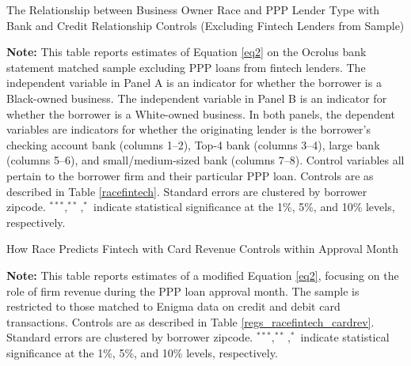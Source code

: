 \documentclass[11pt]{article}
\begin{document}
\newpage
\begin{table}[H]
	\caption{The Relationship between Business Owner Race and PPP Lender Type with Bank and Credit Relationship Controls (Excluding Fintech Lenders from Sample)} \label{regsbanknofintech}
	\begin{adjustbox}{width=\linewidth}
		
	\end{adjustbox}
	
	\begin{adjustbox}{width=\linewidth}
		
	\end{adjustbox}

	\begin{minipage}{\textwidth} \medskip
		\footnotesize{{\bf Note: }This table reports estimates of Equation \ref{eq2} on the Ocrolus bank statement matched sample excluding PPP loans from fintech lenders. The independent variable in Panel A is an indicator for whether the borrower is a Black-owned business. The independent variable in Panel B is an indicator for whether the borrower is a White-owned business. In both panels, the dependent variables are indicators for whether the originating lender is the borrower's checking account bank (columns 1--2), Top-4 bank (columns 3--4), large bank (columns 5--6), and small/medium-sized bank (columns 7--8). Control variables all pertain to the borrower firm and their particular PPP loan. Controls are as described in Table \ref{racefintech}. Standard errors are clustered by borrower zipcode. $^{***}, ^{**}, ^{*}$ indicate statistical significance at the 1\%, 5\%, and 10\% levels, respectively.}
	\end{minipage}
\end{table}



\newpage
    \begin{table}[H]
    	\caption{How Race Predicts Fintech with Card Revenue Controls within Approval Month} \label{regs_racefintech_cardrev_appmonth}
    	\begin{adjustbox}{width=\linewidth, center}
    		
    	\end{adjustbox}
    	\begin{minipage}{\linewidth} \medskip
    		\footnotesize{{\bf Note: }This table reports estimates of a modified Equation \ref{eq2}, focusing on the role of firm revenue during the PPP loan approval month. The sample is restricted to those matched to Enigma data on credit and debit card transactions. Controls are as described in Table \ref{regs_racefintech_cardrev}. Standard errors are clustered by borrower zipcode. $^{***}, ^{**}, ^{*}$ indicate statistical significance at the 1\%, 5\%, and 10\% levels, respectively.}
    	\end{minipage}
    \end{table}
\end{document}
